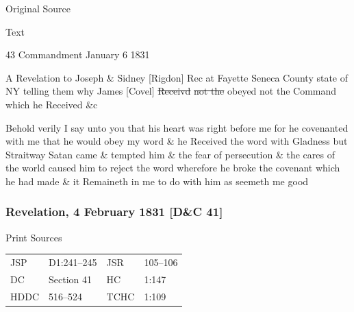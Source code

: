 			\begin{description}
				\item[Original Source]
			\end{description}
			
			
			\begin{description}
				\item[Text]
			\end{description}
			
				\begin{tightcenter}
				43 Commandment January 6 1831
				\end{tightcenter}
				
				A Revelation to Joseph \& Sidney [Rigdon] Rec at Fayette Seneca County state of NY telling them why James [Covel] \sout{Receivd} \sout{not the} obeyed not the Command which he Received \&c
				
				Behold verily I say unto you that his heart was right before me for he covenanted with me that he would obey my word \& he Received the word with Gladness but Straitway Satan came \& tempted him \& the fear of persecution \& the cares of the world caused him to reject the word wherefore he broke the covenant which he had made \& it Remaineth in me to do with him as seemeth me good
				
		\subsubsection{Revelation, 4 February 1831 [D\&C 41]}
			\label{EMS-1831-JS-4-FEB-1831}
		
			\begin{description}
				\item[Print Sources]
			\end{description}

				\begin{tabular}{p{0.5in}p{1in}p{0.5in}p{1in}}
				JSP	 	& D1:241--245	& JSR 		& 105--106 \\
				DC	 	& Section 41 	& HC 		& 1:147 \\
				HDDC 	& 516--524		& TCHC 		& 1:109 \\
				\end{tabular}
			
